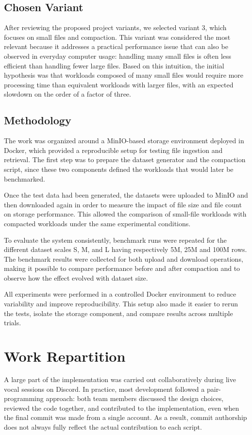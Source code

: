 \documentclass{article}
\begin{document}
\subsection{Chosen Variant}
After reviewing the proposed project variants, we selected variant 3, which focuses on small files and compaction. This variant was considered the most relevant because it addresses a practical performance issue that can also be observed in everyday computer usage: handling many small files is often less efficient than handling fewer large files. Based on this intuition, the initial hypothesis was that workloads composed of many small files would require more processing time than equivalent workloads with larger files, with an expected slowdown on the order of a factor of three.

\subsection{Methodology}
The work was organized around a MinIO-based storage environment deployed in Docker, which provided a reproducible setup for testing file ingestion and retrieval. The first step was to prepare the dataset generator and the compaction script, since these two components defined the workloads that would later be benchmarked.

Once the test data had been generated, the datasets were uploaded to MinIO and then downloaded again in order to measure the impact of file size and file count on storage performance. This allowed the comparison of small-file workloads with compacted workloads under the same experimental conditions.

To evaluate the system consistently, benchmark runs were repeated for the different dataset scales S, M, and L having respectively 5M, 25M and 100M rows. The benchmark results were collected for both upload and download operations, making it possible to compare performance before and after compaction and to observe how the effect evolved with dataset size.

All experiments were performed in a controlled Docker environment to reduce variability and improve reproducibility. This setup also made it easier to rerun the tests, isolate the storage component, and compare results across multiple trials.
\section{Work Repartition}

A large part of the implementation was carried out collaboratively during live vocal sessions on Discord. In practice, most development followed a pair-programming approach: both team members discussed the design choices, reviewed the code together, and contributed to the implementation, even when the final commit was made from a single account. As a result, commit authorship does not always fully reflect the actual contribution to each script.
\end{document}
